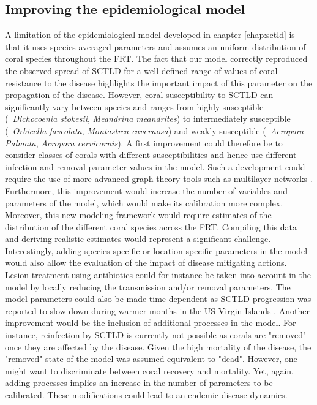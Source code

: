 \subsection*{Improving the epidemiological model}
A limitation of the epidemiological model developed in chapter \ref{chap:sctld} is that it uses species-averaged parameters and assumes an uniform distribution of coral species throughout the FRT. The fact that our model correctly reproduced the observed spread of SCTLD for a well-defined range of values of coral resistance to the disease highlights the important impact of this parameter on the propagation of the disease. However, coral susceptibility to SCTLD can significantly vary between species and ranges from highly susceptible (\eg~\textit{Dichocoenia stokesii}, \textit{Meandrina meandrites}) to intermediately susceptible (\eg~\textit{Orbicella faveolata}, \textit{Montastrea cavernosa}) and weakly susceptible (\eg~\textit{Acropora Palmata}, \textit{Acropora cervicornis}). A first improvement could therefore be to consider classes of corals with different susceptibilities and hence use different infection and removal parameter values in the model. Such a development could require the use of more advanced graph theory tools such as multilayer networks \citep{kivela2014multilayer,pilosof2017multilayer}. Furthermore, this improvement would increase the number of variables and parameters of the model, which  would make its calibration more complex. Moreover, this new modeling framework would require estimates of the distribution of the different coral species across the FRT. Compiling this data and deriving realistic estimates would represent a significant challenge. Interestingly, adding species-specific or location-specific parameters in the model would also allow the evaluation of the impact of disease mitigating actions. Lesion treatment using antibiotics could for instance be taken into account in the model by locally reducing the transmission and/or removal parameters. The model parameters could also be made time-dependent as SCTLD progression was reported to slow down during warmer months in the US Virgin Islands \citep{meiling20203d}. Another improvement would be the inclusion of additional processes in the model. For instance, reinfection by SCTLD is currently not possible as corals are "removed" once they are affected by the disease. Given the high mortality of the disease, the "removed" state of the model was assumed equivalent to "dead". However, one might want to discriminate between coral recovery and mortality. Yet, again, adding processes implies an increase in the number of parameters to be calibrated. These modifications could lead to an endemic disease dynamics. 

